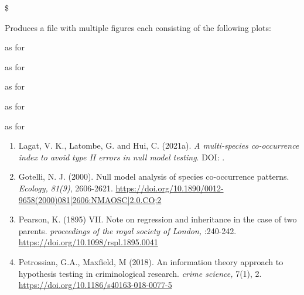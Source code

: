 \documentclass[a4paper]{book}
\begin{document}
\begin{Value}
\begin{itemize}
\begin{itemize}
\end{itemize}


\end{itemize}


\$

Produces a  file with multiple figures each consisting of the following plots:

\begin{ldescription}
\item[\code{(a)}] as for 
\item[\code{(b)}] as for 
\item[\code{(c)}] as for 
\item[\code{(d)}] as for 
\item[\code{(e)}] as for 
\end{ldescription}
\end{Value}
%
\begin{References}\relax
\begin{enumerate}

\item{} Lagat, V. K., Latombe, G. and Hui, C. (2021a). \emph{A multi-species co-occurrence
index to avoid type II errors in null model testing}. DOI: .

\item{} Gotelli, N. J. (2000). Null model analysis of species co-occurrence patterns.
\emph{Ecology, 81(9)}, 2606-2621. \url{https://doi.org/10.1890/0012-9658(2000)081[2606:NMAOSC]2.0.CO;2}

\item{} Pearson, K. (1895) VII. Note on regression and inheritance in the
case of two parents. \emph{proceedings of the royal society of London,} :240-242.
\url{https://doi.org/10.1098/rspl.1895.0041}

\item{} Petrossian, G.A., Maxfield, M (2018). An information theory approach to hypothesis testing in
criminological research. \emph{crime science,} 7(1), 2. \url{https://doi.org/10.1186/s40163-018-0077-5}

\end{enumerate}

\end{References}
%
\end{document}
